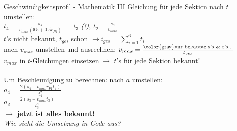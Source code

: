 
\begin{frame}{Geschwindigkeitsprofil - Mathematik III}
	Gleichung für jede Sektion nach $t$ umstellen:\\
	\vspace{0.1cm}
	\pause$t_4 = \frac{s_4}{v_{max} (0.5 + 0.5 r_{P1})}$ \pause $ = t_3$ \textit{(!)}\pause, $t_2 = \frac{s_2}{v_{max}}$\\
	\vspace{0.1cm}
	\pause$t$'s nicht bekannt, $t_{ges}$ schon \pause$\rightarrow t_{ges} = \sum\limits_{i=1}^6 t_i$\\
	\vspace{0.1cm}
	\pause nach $v_{max}$ umstellen und ausrechnen: \pause$v_{max} = \frac{\text{{\color{gray}nur bekannte s's \& r's...}}}{t_{ges}}$\\
	\vspace{0.3cm}
	\pause$v_{max}$ in $t$-Gleichungen einsetzen \pause$\rightarrow$ $t$'s für jede Sektion bekannt!\\
	\vspace{0.1cm}
	\\
	\vspace{0.2cm}
	\pause Um Beschleunigung zu berechnen:  nach $a$ umstellen:\\
	\vspace{0.2cm}
	\pause{} $a_4 = \frac{2 (s_4 - v_{max} r_{P1} t_4)}{t_4^2}$\\
	\pause{} $a_3 = \frac{2 (s_3 - v_{max} t_3)}{t_3^2}$\\
	\vspace{0.2cm}
	\pause\hspace*{10mm}$\rightarrow$ \textbf{jetzt ist alles bekannt!}\\
	\vspace{0.2cm}
	\pause\textit{Wie sieht die Umsetzung in Code aus?}
\end{frame}


